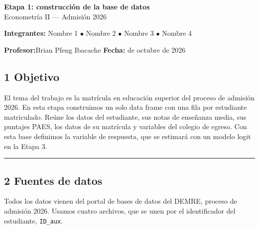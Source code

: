 \documentclass[11pt]{article}
\begin{document}
\sloppy

\begin{center}
  {\LARGE \textbf{Etapa 1: construcción de la base de datos}}\\[4pt]
  {\large Econometría II --- Admisión 2026}
\end{center}
\vspace{0.5em}

\vspace{0.8cm}

\begin{center}
\textbf{Integrantes:}\quad
Nombre 1 $\bullet$
Nombre 2 $\bullet$
Nombre 3 $\bullet$
Nombre 4

\vspace{0.4cm}

\textbf{Profesor:}\quad Brian Pfeng Ibacache
\qquad
\textbf{Fecha:} de octubre de 2026
\end{center}

\bigskip

\subsection*{1 \; Objetivo}

El tema del trabajo es la matrícula en educación superior del proceso de
admisión 2026. En esta etapa construimos un solo data frame con una fila
por estudiante matriculado. Reúne los datos del estudiante, sus notas de
enseñanza media, sus puntajes PAES, los datos de su matrícula y variables
del colegio de egreso. Con esta base definimos la variable de respuesta,
que se estimará con un modelo logit en la Etapa 3.

\medskip\hrule\medskip

\subsection*{2 \; Fuentes de datos}

Todos los datos vienen del portal de bases de datos del DEMRE, proceso de
admisión 2026. Usamos cuatro archivos, que se unen por el identificador
del estudiante, \texttt{ID\_aux}.
\end{document}
